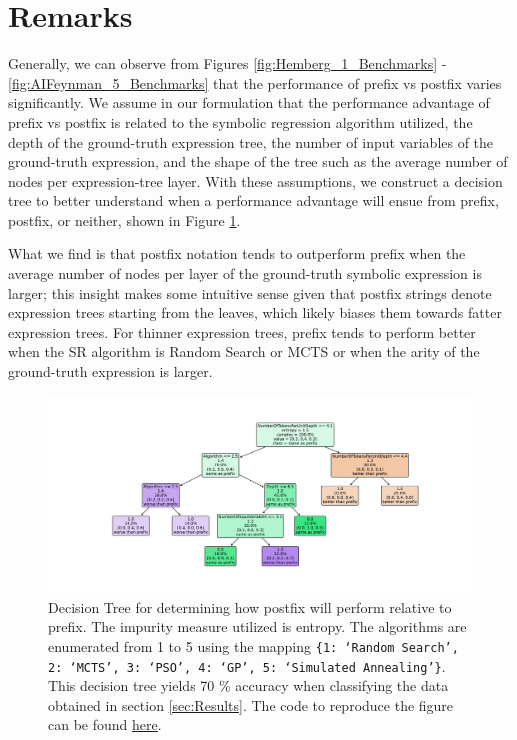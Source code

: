 \documentclass[12pt]{iopart}
\begin{document}
\section{Remarks}
Generally, we can observe from Figures \ref{fig:Hemberg_1_Benchmarks} - \ref{fig:AIFeynman_5_Benchmarks} that the performance of prefix vs postfix varies significantly. We assume in our formulation that the performance advantage of prefix vs postfix is related to the symbolic regression algorithm utilized, the depth of the ground-truth expression tree, the number of input variables of the ground-truth expression, and the shape of the tree such as the average number of nodes per expression-tree layer. With these assumptions, we construct a decision tree to better understand when a performance advantage will ensue from prefix, postfix, or neither, shown in Figure \ref{fig:PrefixPostfixDecisionTree}. 
\par What we find is that postfix notation tends to outperform prefix when the average number of nodes per layer of the ground-truth symbolic expression is larger; this insight makes some intuitive sense given that postfix strings denote expression trees starting from the leaves, which likely biases them towards fatter expression trees. For thinner expression trees, prefix tends to perform better when the SR algorithm is Random Search or MCTS or when the arity of the ground-truth expression is larger. 

\begin{figure}
    \centering
    \includegraphics[width=\linewidth]{PrefixPostfixDecisionTree.pdf}
    \caption{Decision Tree for determining how postfix will perform relative to prefix. The impurity measure utilized is entropy. The algorithms are enumerated from 1 to 5 using the mapping \texttt{\{1: `Random Search', 2: `MCTS', 3: `PSO', 4: `GP', 5: `Simulated Annealing'\}}. This decision tree yields 70 \% accuracy when classifying the data obtained in section \ref{sec:Results}. The code to reproduce the figure can be found \href{https://github.com/edfink234/Alpha-Zero-Symbolic-Regression/blob/ec9a0c72188606b3a03b9651b794a2f01f351854/PrefixPostfixDecisionTree.py}{here}. } 
    \label{fig:PrefixPostfixDecisionTree}
\end{figure}
\end{document}
